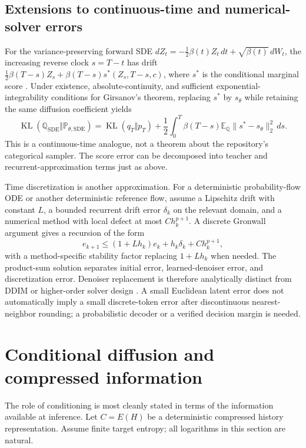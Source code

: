 \documentclass{article}
\theoremstyle{remark}\newtheorem{remark}[theorem]{Remark}
\newcommand{\E}{\mathbb E}
\newcommand{\KL}{\operatorname{KL}}
\begin{document}
\subsection{Extensions to continuous-time and numerical-solver errors}
For the variance-preserving forward SDE
$dZ_t=-\tfrac12\beta(t)Z_t\,dt+\sqrt{\beta(t)}\,dW_t$,
the increasing reverse clock $s=T-t$ has drift
$\tfrac12\beta(T-s)Z_s+\beta(T-s)s^*(Z_s,T-s,c)$,
where $s^*$ is the conditional marginal score \cite{scoresde}.
Under existence, absolute-continuity, and sufficient exponential-integrability conditions for Girsanov's theorem, replacing $s^*$ by $s_\theta$ while retaining the same diffusion coefficient yields
\begin{equation}
 \KL(\mathbb Q_{\mathrm{SDE}}\Vert\mathbb P_{\theta,\mathrm{SDE}})
 =\KL(q_T\Vert p_T)+\frac12\int_0^T\beta(T-s)
 \E_{\mathbb Q}\|s^*-s_\theta\|_2^2\,ds.
 \label{eq:sdegirsanov}
\end{equation}
This is a continuous-time analogue, not a theorem about the repository's categorical sampler. The score error can be decomposed into teacher and recurrent-approximation terms just as above.

Time discretization is another approximation. For a deterministic probability-flow ODE or another deterministic reference flow, assume a Lipschitz drift with constant $L$, a bounded recurrent drift error $\delta_k$ on the relevant domain, and a numerical method with local defect at most $Ch_k^{p+1}$. A discrete Gronwall argument gives a recursion of the form
\begin{equation}
 e_{k+1}\le(1+Lh_k)e_k+h_k\delta_k+Ch_k^{p+1},
 \label{eq:solvererror}
\end{equation}
with a method-specific stability factor replacing $1+Lh_k$ when needed. The product-sum solution separates initial error, learned-denoiser error, and discretization error. Denoiser replacement is therefore analytically distinct from DDIM or higher-order solver design \cite{ddim,dpmsolver}. A small Euclidean latent error does not automatically imply a small discrete-token error after discontinuous nearest-neighbor rounding; a probabilistic decoder or a verified decision margin is needed.

\section{Conditional diffusion and compressed information}
\label{sec:information}
The role of conditioning is most cleanly stated in terms of the information available at inference. Let $C=E(H)$ be a deterministic compressed history representation. Assume finite target entropy; all logarithms in this section are natural.
\end{document}
